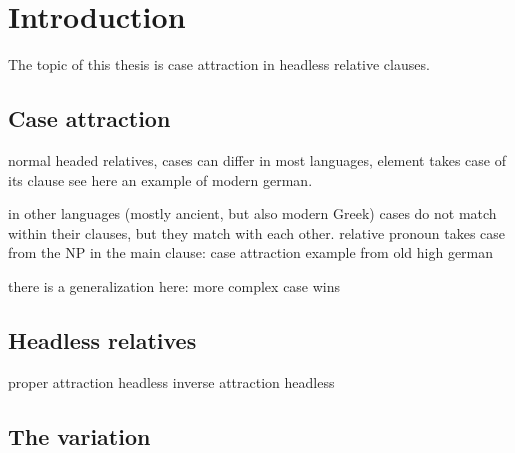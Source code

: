 
\chapter{Introduction}

The topic of this thesis is case attraction in headless relative clauses.

\section{Case attraction}

normal headed relatives, cases can differ
in most languages, element takes case of its clause
see here an example of modern german.


in other languages (mostly ancient, but also modern Greek) cases do not match within their clauses, but they match with each other.
relative pronoun takes case from the NP in the main clause: case attraction
example from old high german

there is a generalization here: more complex case wins


\section{Headless relatives}

proper attraction headless
inverse attraction headless



\section{The variation}
